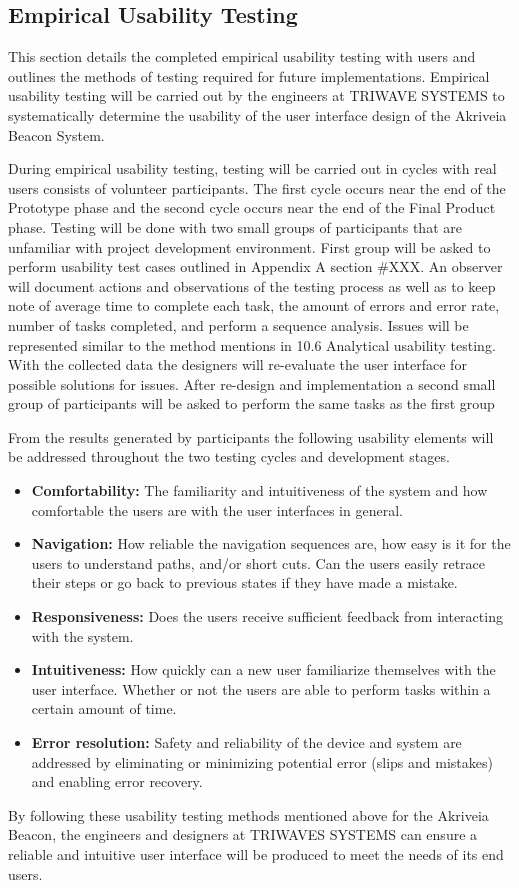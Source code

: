 

\subsection{Empirical Usability Testing}
\medskip
This section details the completed empirical usability testing with users and outlines the methods of testing required for future implementations. Empirical usability testing will be carried out by the engineers at TRIWAVE SYSTEMS to systematically determine the usability of the user interface design of the Akriveia Beacon System. 

\bigskip
During empirical usability testing, testing will be carried out in cycles with real users consists of volunteer participants. The first cycle occurs near the end of the Prototype phase and the second cycle occurs near the end of the Final Product phase. Testing will be done with two small groups of participants that are unfamiliar with project development environment. First group will be asked to perform usability test cases outlined in Appendix A section \#XXX. An observer will document actions and observations of the testing process as well as to keep note of average time to complete each task, the amount of errors and error rate, number of tasks completed, and perform a sequence analysis. Issues will be represented similar to the method mentions in 10.6 Analytical usability testing. With the collected data the designers will re-evaluate the user interface for possible solutions for issues. After re-design and implementation a second small group of participants will be asked to perform the same tasks as the first group

\bigskip
From the results generated by participants the following usability elements will be addressed throughout the two testing cycles and development stages. 

\medskip

\begin{itemize}
\setlength\itemsep{0.1mm}
	\item \textbf{Comfortability:} The familiarity and intuitiveness of the system and how comfortable the users are with the user interfaces in general. 
	\item \textbf{Navigation:} How reliable the navigation sequences are, how easy is it for the users to understand paths, and/or short cuts. Can the users easily retrace their steps or go back to previous states if they have made a mistake.
	\item \textbf{Responsiveness:} Does the users receive sufficient feedback from interacting with the system. 
	\item \textbf{Intuitiveness:} How quickly can a new user familiarize themselves with the user interface. Whether or not the users are able to perform tasks within a certain amount of time.
	\item \textbf{Error resolution:} Safety and reliability of the device and system are addressed by eliminating or minimizing potential error (slips and mistakes) and enabling error recovery.
\end{itemize}

\medskip
By following these usability testing methods mentioned above for the Akriveia Beacon, the engineers and designers at TRIWAVES SYSTEMS can ensure a reliable and intuitive user interface will be produced to meet the needs of its end users. 
